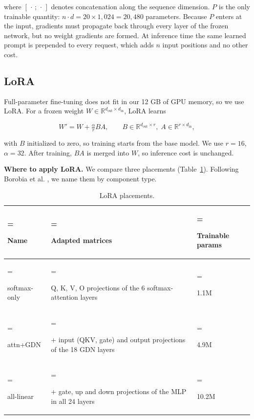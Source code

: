 \documentclass{article}
\begin{document}
where $[\,\cdot\,;\,\cdot\,]$ denotes concatenation along the sequence dimension. $P$ is the only trainable quantity: $n \cdot d = 20 \times 1{,}024 = 20{,}480$ parameters. Because $P$ enters at the input, gradients must propagate back through every layer of the frozen network, but no weight gradients are formed. At inference time the same learned prompt is prepended to every request, which adds $n$ input positions and no other cost.

\subsection{LoRA}\label{sec:3.6}

Full-parameter fine-tuning does not fit in our 12 GB of GPU memory, so we use LoRA. For a frozen weight $W \in \mathbb{R}^{d_\text{out}\times d_\text{in}}$, LoRA learns

\begin{equation}
\label{eq:lora-update}
W' = W + \tfrac{\alpha}{r} BA, \qquad B \in \mathbb{R}^{d_\text{out}\times r},\; A \in \mathbb{R}^{r\times d_\text{in}},
\end{equation}

with $B$ initialized to zero, so training starts from the base model. We use $r = 16$, $\alpha = 32$. After training, $BA$ is merged into $W$, so inference cost is unchanged.

\textbf{Where to apply LoRA.} We compare three placements (Table~\ref{tab:2}). Following Borobia et al. \cite{ref22}, we name them by component type.

\begin{table}[!htbp]
\centering
\caption{LoRA placements.}\label{tab:2}
\small
\setlength{\tabcolsep}{4pt}
\renewcommand{\arraystretch}{1.12}
\begin{tabularx}{\linewidth}{@{}>{\hsize=0.65\hsize\linewidth=\hsize\raggedright\arraybackslash}X>{\hsize=1.78\hsize\linewidth=\hsize\raggedright\arraybackslash}X>{\hsize=0.57\hsize\linewidth=\hsize\raggedright\arraybackslash}X@{}}
\toprule
\textbf{Name} & \textbf{Adapted matrices} & \textbf{Trainable params} \\
\midrule
softmax-only & Q, K, V, O projections of the 6 softmax-attention layers & 1.1M \\
attn+GDN & + input (QKV, gate) and output projections of the 18 GDN layers & 4.9M \\
all-linear & + gate, up and down projections of the MLP in all 24 layers & 10.2M \\
\bottomrule
\end{tabularx}
\end{table}
\end{document}
